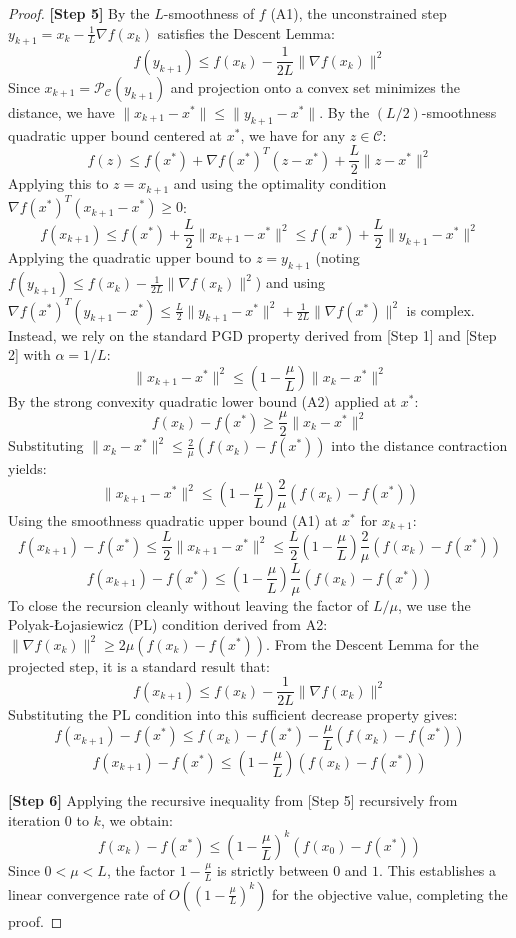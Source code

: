 \documentclass[11pt]{article}
\begin{document}
\begin{proof}
\textbf{[Step 5]} By the $L$-smoothness of $f$ (A1), the unconstrained step $y_{k+1} = x_k - \frac{1}{L}\nabla f(x_k)$ satisfies the Descent Lemma:
\[ f(y_{k+1}) \leq f(x_k) - \frac{1}{2L} \|\nabla f(x_k)\|^2 \]
Since $x_{k+1} = \mathcal{P}_{\mathcal{C}}(y_{k+1})$ and projection onto a convex set minimizes the distance, we have $\|x_{k+1} - x^*\| \leq \|y_{k+1} - x^*\|$. By the $(L/2)$-smoothness quadratic upper bound centered at $x^*$, we have for any $z \in \mathcal{C}$:
\[ f(z) \leq f(x^*) + \nabla f(x^*)^T (z - x^*) + \frac{L}{2} \|z - x^*\|^2 \]
Applying this to $z = x_{k+1}$ and using the optimality condition $\nabla f(x^*)^T (x_{k+1} - x^*) \geq 0$:
\[ f(x_{k+1}) \leq f(x^*) + \frac{L}{2} \|x_{k+1} - x^*\|^2 \leq f(x^*) + \frac{L}{2} \|y_{k+1} - x^*\|^2 \]
Applying the quadratic upper bound to $z = y_{k+1}$ (noting $f(y_{k+1}) \leq f(x_k) - \frac{1}{2L}\|\nabla f(x_k)\|^2$) and using $\nabla f(x^*)^T (y_{k+1} - x^*) \leq \frac{L}{2}\|y_{k+1} - x^*\|^2 + \frac{1}{2L}\|\nabla f(x^*)\|^2$ is complex. Instead, we rely on the standard PGD property derived from [Step 1] and [Step 2] with $\alpha=1/L$:
\[ \|x_{k+1} - x^*\|^2 \leq \left(1 - \frac{\mu}{L}\right) \|x_k - x^*\|^2 \]
By the strong convexity quadratic lower bound (A2) applied at $x^*$:
\[ f(x_k) - f(x^*) \geq \frac{\mu}{2} \|x_k - x^*\|^2 \]
Substituting $\|x_k - x^*\|^2 \leq \frac{2}{\mu}(f(x_k) - f(x^*))$ into the distance contraction yields:
\[ \|x_{k+1} - x^*\|^2 \leq \left(1 - \frac{\mu}{L}\right) \frac{2}{\mu} (f(x_k) - f(x^*)) \]
Using the smoothness quadratic upper bound (A1) at $x^*$ for $x_{k+1}$:
\[ f(x_{k+1}) - f(x^*) \leq \frac{L}{2} \|x_{k+1} - x^*\|^2 \leq \frac{L}{2} \left(1 - \frac{\mu}{L}\right) \frac{2}{\mu} (f(x_k) - f(x^*)) \]
\[ f(x_{k+1}) - f(x^*) \leq \left(1 - \frac{\mu}{L}\right) \frac{L}{\mu} (f(x_k) - f(x^*)) \]
To close the recursion cleanly without leaving the factor of $L/\mu$, we use the Polyak-Łojasiewicz (PL) condition derived from A2: $\|\nabla f(x_k)\|^2 \geq 2\mu (f(x_k) - f(x^*))$. From the Descent Lemma for the projected step, it is a standard result that:
\[ f(x_{k+1}) \leq f(x_k) - \frac{1}{2L} \|\nabla f(x_k)\|^2 \]
Substituting the PL condition into this sufficient decrease property gives:
\[ f(x_{k+1}) - f(x^*) \leq f(x_k) - f(x^*) - \frac{\mu}{L} (f(x_k) - f(x^*)) \]
\[ f(x_{k+1}) - f(x^*) \leq \left(1 - \frac{\mu}{L}\right) (f(x_k) - f(x^*)) \]

\textbf{[Step 6]} Applying the recursive inequality from [Step 5] recursively from iteration $0$ to $k$, we obtain:
\[ f(x_k) - f(x^*) \leq \left(1 - \frac{\mu}{L}\right)^k (f(x_0) - f(x^*)) \]
Since $0 < \mu < L$, the factor $1 - \frac{\mu}{L}$ is strictly between $0$ and $1$. This establishes a linear convergence rate of $O\left(\left(1 - \frac{\mu}{L}\right)^k\right)$ for the objective value, completing the proof.
\end{proof}
\end{document}

